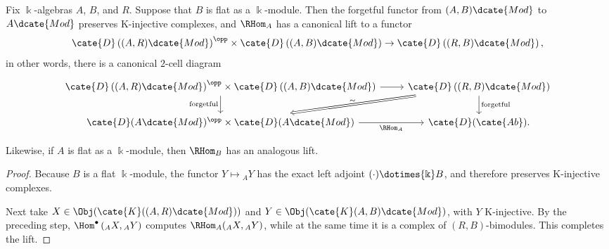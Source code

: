 \begin{lemma}\label{prop:RHom-enrichment}
	Fix $\Bbbk$-algebras $A$, $B$, and $R$. Suppose that $B$ is flat as a
	$\Bbbk$-module. Then the forgetful functor from $(A,B)\dcate{Mod}$ to
	$A\dcate{Mod}$ preserves K-injective complexes, and $\RHom_A$ has a
	canonical lift to a functor
	\[ \cate{D}\left((A,R)\dcate{Mod}\right)^{\opp} \times \cate{D}\left((A,B)\dcate{Mod}\right) \to \cate{D}\left((R,B)\dcate{Mod}\right), \]
	in other words, there is a canonical $2$-cell diagram
	\[\begin{tikzcd}
		\cate{D}\left((A,R)\dcate{Mod}\right)^{\opp} \times \cate{D}\left((A,B)\dcate{Mod}\right) \arrow[r] \arrow[d, "\text{forgetful}"'] & \cate{D}\left((R,B)\dcate{Mod}\right) \arrow[d, "\text{forgetful}"] \arrow[Rightarrow, ld, "\sim", sloped] \\
		\cate{D}(A\dcate{Mod})^{\opp} \times \cate{D}(A\dcate{Mod}) \arrow[r, "{\RHom_A}"'] & \cate{D}(\cate{Ab}) .
	\end{tikzcd}\]

	Likewise, if $A$ is flat as a $\Bbbk$-module, then $\RHom_B$ has an
	analogous lift.
\end{lemma}
\begin{proof}
	Because $B$ is a flat $\Bbbk$-module, the functor $Y\mapsto{}_A Y$ has the
	exact left adjoint $(\cdot)\dotimes{\Bbbk}B$, and therefore preserves
	K-injective complexes.

	Next take $X\in\Obj(\cate{K}((A,R)\dcate{Mod}))$ and
	$Y\in\Obj(\cate{K}(A,B)\dcate{Mod})$, with $Y$ K-injective. By the
	preceding step, $\Hom^\bullet\left({}_A X,{}_A Y\right)$ computes
	$\RHom_A({}_A X,{}_A Y)$, while at the same time it is a complex of
	$(R,B)$-bimodules. This completes the lift.
\end{proof}

